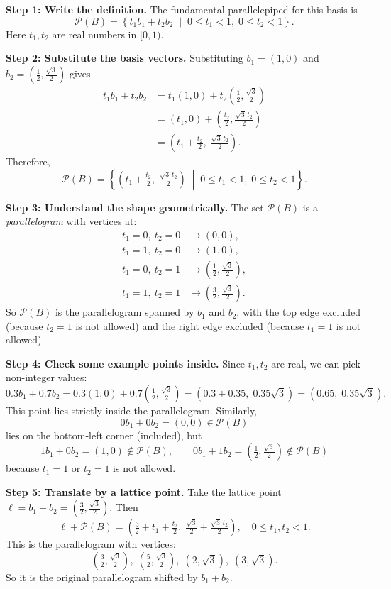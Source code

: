 \medskip
\noindent
\textbf{Step 1: Write the definition.}
The fundamental parallelepiped for this basis is
\[
\mathcal{P}(B)
=
\left\{
t_1 b_1 + t_2 b_2
\;\middle|\;
0 \le t_1 < 1,\; 0 \le t_2 < 1
\right\}.
\]
Here $t_1, t_2$ are real numbers in $[0,1)$.

\medskip
\noindent
\textbf{Step 2: Substitute the basis vectors.}
Substituting $b_1=(1,0)$ and $b_2=\left(\tfrac12, \tfrac{\sqrt{3}}{2}\right)$ gives
\[
\begin{aligned}
t_1 b_1 + t_2 b_2
&= t_1(1,0) + t_2\left(\tfrac12, \tfrac{\sqrt{3}}{2}\right) \\
&= \left(t_1, 0\right) + \left(\tfrac{t_2}{2}, \tfrac{\sqrt{3}\,t_2}{2}\right) \\
&= \left(t_1 + \tfrac{t_2}{2},\; \tfrac{\sqrt{3}\,t_2}{2}\right).
\end{aligned}
\]
Therefore,
\[
\mathcal{P}(B)
=
\left\{
\left(t_1 + \tfrac{t_2}{2},\; \tfrac{\sqrt{3}\,t_2}{2}\right)
\;\middle|\;
0 \le t_1 < 1,\; 0 \le t_2 < 1
\right\}.
\]

\medskip
\noindent
\textbf{Step 3: Understand the shape geometrically.}
The set $\mathcal{P}(B)$ is a \emph{parallelogram} with vertices at:
\[
\begin{aligned}
t_1=0,\ t_2=0 &\mapsto (0,0), \\
t_1=1,\ t_2=0 &\mapsto (1,0), \\
t_1=0,\ t_2=1 &\mapsto \left(\tfrac12, \tfrac{\sqrt{3}}{2}\right), \\
t_1=1,\ t_2=1 &\mapsto \left(\tfrac32, \tfrac{\sqrt{3}}{2}\right).
\end{aligned}
\]
So $\mathcal{P}(B)$ is the parallelogram spanned by $b_1$ and $b_2$, with the top edge excluded (because $t_2=1$ is not allowed) and the right edge excluded (because $t_1=1$ is not allowed).

\medskip
\noindent
\textbf{Step 4: Check some example points inside.}
Since $t_1, t_2$ are real, we can pick non-integer values:
\[
0.3b_1 + 0.7b_2
= 0.3(1,0) + 0.7\left(\tfrac12, \tfrac{\sqrt{3}}{2}\right)
= (0.3 + 0.35,\; 0.35\sqrt{3})
= (0.65,\; 0.35\sqrt{3}).
\]
This point lies strictly inside the parallelogram. Similarly,
\[
0b_1 + 0b_2 = (0,0) \in \mathcal{P}(B)
\]
lies on the bottom-left corner (included), but
\[
1b_1 + 0b_2 = (1,0) \notin \mathcal{P}(B), \qquad
0b_1 + 1b_2 = \left(\tfrac12, \tfrac{\sqrt{3}}{2}\right) \notin \mathcal{P}(B)
\]
because $t_1=1$ or $t_2=1$ is not allowed.

\medskip
\noindent
\textbf{Step 5: Translate by a lattice point.}
Take the lattice point $\ell = b_1 + b_2 = \left(\tfrac32, \tfrac{\sqrt{3}}{2}\right)$. Then
\[
\ell + \mathcal{P}(B)
=
\left(
\tfrac32 + t_1 + \tfrac{t_2}{2},\;
\tfrac{\sqrt{3}}{2} + \tfrac{\sqrt{3}\,t_2}{2}
\right),
\quad 0 \le t_1,t_2 < 1.
\]
This is the parallelogram with vertices:
\[
\left(\tfrac32, \tfrac{\sqrt{3}}{2}\right),\;
\left(\tfrac52, \tfrac{\sqrt{3}}{2}\right),\;
\left(2, \sqrt{3}\right),\;
\left(3, \sqrt{3}\right).
\]
So it is the original parallelogram shifted by $b_1+b_2$.


